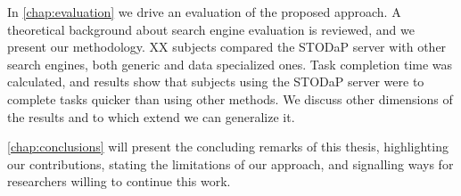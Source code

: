 In \autoref{chap:evaluation} we drive an evaluation of the proposed approach.
A theoretical background about search engine evaluation is reviewed, and we present our methodology.
XX subjects compared the STODaP server with other search engines, both generic and data specialized ones.
Task completion time was calculated, and results show that subjects using the STODaP server were to complete tasks quicker than using other methods.
We discuss other dimensions of the results and to which extend we can generalize it.

\autoref{chap:conclusions} will present the concluding remarks of this thesis, highlighting our contributions, stating the limitations of our approach, and signalling ways for researchers willing to continue this work.
